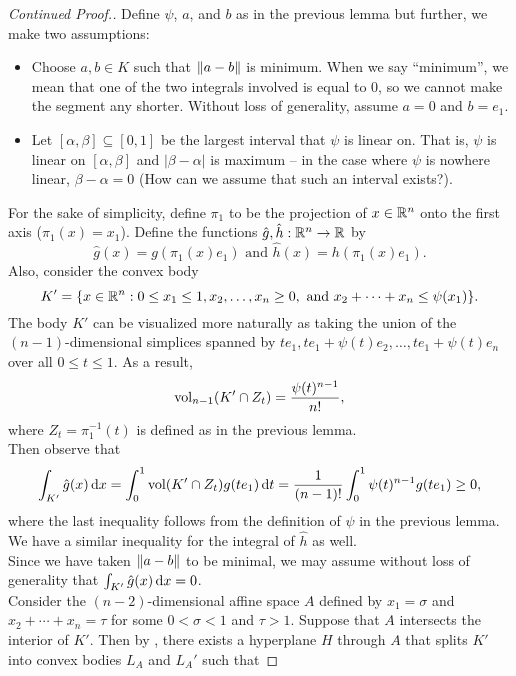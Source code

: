 \begin{proof}[Continued Proof.]
	Define $\psi$, $a$, and $b$ as in the previous lemma but further, we make two assumptions: 
	\begin{itemize}
		\item Choose $a,b\in K$ such that $\left\lVert a-b\right\rVert$ is minimum. When we say ``minimum'', we mean that one of the two integrals involved is equal to $0$, so we cannot make the segment any shorter. Without loss of generality, assume $a=0$ and $b=e_1$.
		\item Let $[\alpha,\beta]\subseteq[0,1]$ be the largest interval that $\psi$ is linear on. That is, $\psi$ is linear on $[\alpha,\beta]$ and $|\beta-\alpha|$ is maximum -- in the case where $\psi$ is nowhere linear, $\beta-\alpha=0$ (How can we assume that such an interval exists?).
	\end{itemize}
	For the sake of simplicity, define $\pi_1$ to be the projection of $x\in\mathbb{R}^n$ onto the first axis ($\pi_1(x)=x_1$). Define the functions $\hat{g},\hat{h}:\mathbb{R}^n\to\mathbb{R}$ by
	\[ \hat{g}(x)=g(\pi_1(x)e_1) \text{ and } \hat{h}(x)=h(\pi_1(x)e_1). \]
	Also, consider the convex body
	\[ K' = \{x\in\mathbb{R}^n : 0\leq x_1\leq 1, x_2,\ldots,x_n\geq 0,\text{ and }x_2+\cdots+x_n\leq\psi(x_1)\}. \]
	The body $K'$ can be visualized more naturally as taking the union of the $(n-1)$-dimensional simplices spanned by $te_1, te_1+\psi(t)e_2,\ldots,te_1+\psi(t)e_n$ over all $0\leq t\leq 1$. As a result,
	\[ \operatorname{vol}_{n-1} (K'\cap Z_t) = \frac{\psi(t)^{n-1}}{n!}, \]
	where $Z_t=\pi_1^{-1}(t)$ is defined as in the previous lemma.\\
	Then observe that
	\[ \int_{K'} \hat{g}(x)\operatorname{d}\!{x} = \int_0^1 \operatorname{vol}(K' \cap Z_t) g(t e_1) \operatorname{d}\!{t} = \frac{1}{(n-1)!} \int_0^1 \psi(t)^{n-1} g(te_1) \geq 0, \]
	where the last inequality follows from the definition of $\psi$ in the previous lemma. We have a similar inequality for the integral of $\hat{h}$ as well.\\
	Since we have taken $\left\lVert a-b\right\rVert$ to be minimal, we may assume without loss of generality that $\int_{K'}\hat{g}(x)\operatorname{d}\!{x}=0$.\\
	Consider the $(n-2)$-dimensional affine space $A$ defined by $x_1=\sigma$ and $x_2+\cdots+x_n=\tau$ for some $0<\sigma<1$ and $\tau>1$. Suppose that $A$ intersects the interior of $K'$. Then by , there exists a hyperplane $H$ through $A$ that splits $K'$ into convex bodies $L_A$ and $L_A'$ such that

\end{proof}
